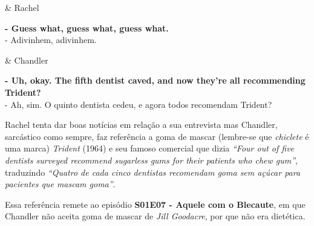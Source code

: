 \begin{tcolorbox}[enhanced,center upper,
    drop fuzzy shadow southeast, boxrule=0.3pt,
    lower separated=false, breakable,
    colframe=black!30!dialogoBorder,colback=white]
\begin{minipage}[c]{0.16\linewidth}
   & \centering \scriptsize{Rachel}
\end{minipage}
\hfill
\begin{minipage}[c]{0.8\linewidth}
  \textbf{- Guess what, guess what, guess what.}\\
  - Adivinhem, adivinhem.
\end{minipage}

\medskip
\begin{minipage}[c]{0.16\linewidth}
   & \centering \scriptsize{Chandler}
\end{minipage}
\hfill
\begin{minipage}[c]{0.8\linewidth}
  \textbf{- Uh, okay. The fifth dentist caved, and now they're all recommending Trident?}\\
  - Ah, sim. O quinto dentista cedeu, e agora todos recomendam Trident?
\end{minipage}
\end{tcolorbox}

Rachel tenta dar boas notícias em relação a sua entrevista mas Chandler,
sarcástico como sempre, faz referência a goma de mascar (lembre-se que
\emph{chiclete} é uma marca) \emph{Trident} (1964) e seu famoso
comercial que dizia \emph{``Four out of five dentists surveyed recommend
sugarless gums for their patients who chew gum''}, traduzindo
\emph{``Quatro de cada cinco dentistas recomendam goma sem açúcar para
pacientes que mascam goma''}.

Essa referência remete ao episódio
\textbf{\textcolor{primarycolor}{S01E07 - Aquele com o Blecaute}}, em
que Chandler não aceita goma de mascar de \emph{Jill Goodacre}, por que
não era dietética.

